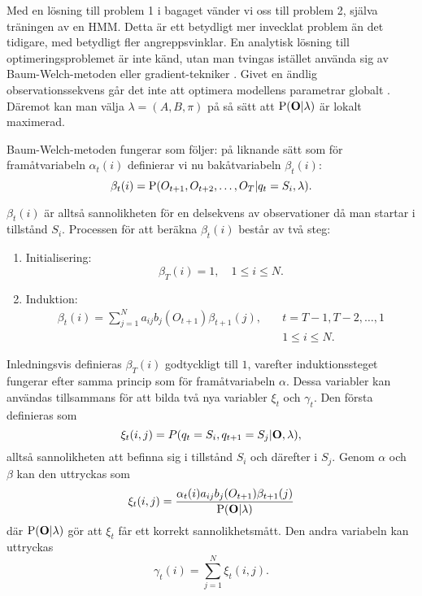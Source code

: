 \documentclass[../rapport_MVEX01-11-05]{subfiles}
\begin{document}
Med en lösning till problem 1 i bagaget vänder vi oss till problem 2,
själva träningen av en HMM. Detta är ett betydligt mer invecklat
problem än det tidigare, med betydligt fler angreppsvinklar. En
analytisk lösning till optimeringsproblemet är inte känd, utan man
tvingas istället använda sig av Baum-Welch-metoden eller
gradient-tekniker \cite{Dempster77,Levinson83}. 
Givet en ändlig observationssekvens går det inte att optimera modellens parametrar globalt \cite{Rabiner89}.
Däremot kan man välja $\lambda = (A,B,\pi)$ på så sätt att $\mathrm{P}(\mathbf{O}|\lambda)$ är lokalt
maximerad. 

Baum-Welch-metoden fungerar som följer:
på liknande sätt som för framåtvariabeln $\alpha_t(i)$
definierar vi nu bakåtvariabeln $\beta_t(i)$: 
\begin{equation*}
\beta_t(i) = \mathrm{P}(O_{t+1},O_{t+2},\dots,O_T | q_t = S_i, \lambda).
\end{equation*} 

$\beta_t(i)$ är alltså sannolikheten för en delsekvens av
observationer då man startar i tillstånd $S_i$. Processen för att beräkna $\beta_t(i)$ består av två steg:
\begin{enumerate}
\item Initialisering: 
\begin{equation*}
\beta_T(i) = 1, \quad 1 \leq i \leq N.
\end{equation*}
\item Induktion: 
\begin{align*}
\beta_t(i) = \sum\limits_{j=1}^Na_{ij}b_j(O_{t+1})\beta_{t+1}(j), \quad &t =
T-1,T-2,\dots,1 \\
&1 \leq i \leq N.
\end{align*}
\end{enumerate}  

Inledningsvis definieras $\beta_T(i)$ godtyckligt till $1$, varefter
induktionssteget fungerar efter samma princip som för framåtvariabeln
$\alpha$. Dessa variabler kan användas tillsammans
för att bilda två nya variabler $\xi_t$ och $\gamma_t$. Den första definieras som 
\begin{equation*}
\xi_t(i,j) = P(q_t = S_i, q_{t+1} = S_j|\mathbf{O},\lambda),
\end{equation*}
alltså sannolikheten att befinna sig i tillstånd $S_i$ och
därefter i $S_j$. Genom $\alpha$ och $\beta$ kan den uttryckas som
\begin{equation*}
\xi_t(i,j) = \frac{\alpha_t(i)a_{ij}b_j(O_{t+1})\beta_{t+1}(j)}{\mathrm{P}(\mathbf{O}|\lambda)}
\end{equation*} 
där $\mathrm{P}(\mathbf{O}|\lambda)$ gör att $\xi_t$ får ett korrekt
sannolikhetsmått.
Den andra variabeln kan uttryckas
\begin{equation*}
\gamma_t(i) = \sum_{j=1}^N\xi_t(i,j).
\end{equation*}
\end{document}
